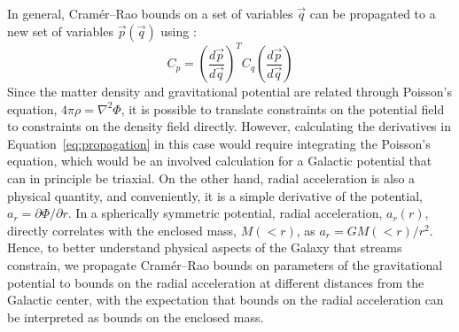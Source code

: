 \documentclass[modern]{aastex61}
\begin{document}
In general, Cram\'er--Rao bounds on a set of variables $\vec{q}$ can be propagated to a new set of variables $\vec{p}(\vec{q})$ using \citep{albrecht2009}:
\begin{equation}
C_p = \left(\frac{d\vec{p}}{d\vec{q}}\right)^{T} C_q \left(\frac{d\vec{p}}{d\vec{q}}\right)
\label{eq:propagation}
\end{equation}
Since the matter density and gravitational potential are related through Poisson's equation, $4\pi\rho = \nabla^2\Phi$, it is possible to translate constraints on the potential field to constraints on the density field directly.
However, calculating the derivatives in Equation~\ref{eq:propagation} in this case would require integrating the Poisson's equation, which would be an involved calculation for a Galactic potential that can in principle be triaxial.
On the other hand, radial acceleration is also a physical quantity, and conveniently, it is a simple derivative of the potential, $a_r = \partial\Phi / \partial r$.
In a spherically symmetric potential, radial acceleration, $a_r(r)$, directly correlates with the enclosed mass, $M(<r)$, as $a_r = G M(<r)/r^2$.
Hence, to better understand physical aspects of the Galaxy that streams constrain, we propagate Cram\'er--Rao bounds on parameters of the gravitational potential to bounds on the radial acceleration at different distances from the Galactic center, with the expectation that bounds on the radial acceleration can be interpreted as bounds on the enclosed mass.
\end{document}

